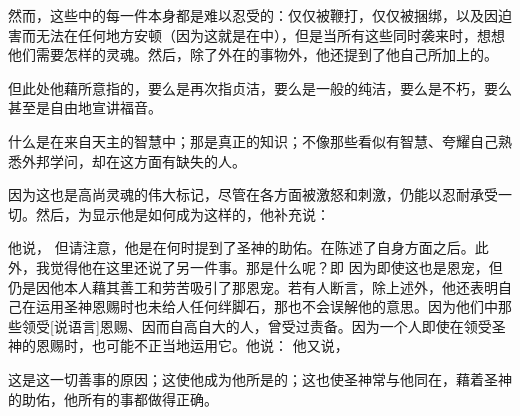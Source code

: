 \par

然而，这些中的每一件本身都是难以忍受的：仅仅被鞭打，仅仅被捆绑，以及因迫害而无法在任何地方安顿（因为这就是在中），但是当所有这些同时袭来时，想想他们需要怎样的灵魂。然后，除了外在的事物外，他还提到了他自己所加上的。\par

\par

但此处他藉所意指的，要么是再次指贞洁，要么是一般的纯洁，要么是不朽，要么甚至是自由地宣讲福音。\par

什么是在来自天主的智慧中；那是真正的知识；不像那些看似有智慧、夸耀自己熟悉外邦学问，却在这方面有缺失的人。\par

因为这也是高尚灵魂的伟大标记，尽管在各方面被激怒和刺激，仍能以忍耐承受一切。然后，为显示他是如何成为这样的，他补充说：\par

  他说， 但请注意，他是在何时提到了圣神的助佑。在陈述了自身方面之后。此外，我觉得他在这里还说了另一件事。那是什么呢？即  因为即使这也是恩宠，但仍是因他本人藉其善工和劳苦吸引了那恩宠。若有人断言，除上述外，他还表明自己在运用圣神恩赐时也未给人任何绊脚石，那也不会误解他的意思。因为他们中那些领受[说语言]恩赐、因而自高自大的人，曾受过责备。因为一个人即使在领受圣神的恩赐时，也可能不正当地运用它。他说： 他又说，\par

 这是这一切善事的原因；这使他成为他所是的；这也使圣神常与他同在，藉着圣神的助佑，他所有的事都做得正确。\par


\subsection{}

\par

